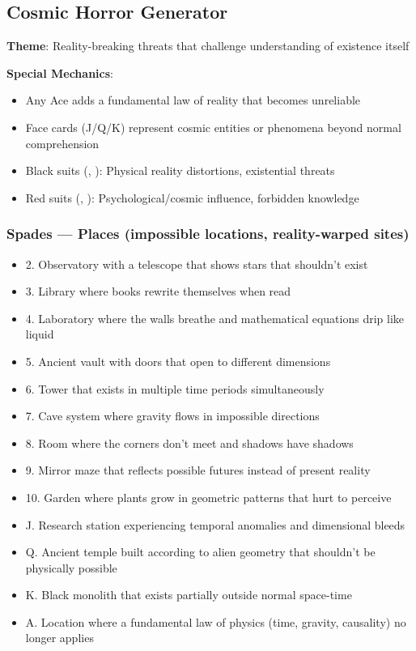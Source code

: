 \documentclass[11pt]{article}
\begin{document}
\subsection{Cosmic Horror Generator}

\begin{mdframed}[backgroundcolor=shadecolor]
\textbf{Theme}: Reality-breaking threats that challenge understanding of existence itself

\textbf{Special Mechanics}:
\begin{itemize}[leftmargin=*]
\item Any Ace adds a fundamental law of reality that becomes unreliable
\item Face cards (J/Q/K) represent cosmic entities or phenomena beyond normal comprehension
\item Black suits (\spadesuit, \clubsuit): Physical reality distortions, existential threats
\item Red suits (\heartsuit, \diamondsuit): Psychological/cosmic influence, forbidden knowledge
\end{itemize}
\end{mdframed}

\subsubsection{Spades --- Places (impossible locations, reality-warped sites)}
\begin{itemize}[leftmargin=*]
\item 2. Observatory with a telescope that shows stars that shouldn't exist
\item 3. Library where books rewrite themselves when read
\item 4. Laboratory where the walls breathe and mathematical equations drip like liquid
\item 5. Ancient vault with doors that open to different dimensions
\item 6. Tower that exists in multiple time periods simultaneously
\item 7. Cave system where gravity flows in impossible directions
\item 8. Room where the corners don't meet and shadows have shadows
\item 9. Mirror maze that reflects possible futures instead of present reality
\item 10. Garden where plants grow in geometric patterns that hurt to perceive
\item J. Research station experiencing temporal anomalies and dimensional bleeds
\item Q. Ancient temple built according to alien geometry that shouldn't be physically possible
\item K. Black monolith that exists partially outside normal space-time
\item A. Location where a fundamental law of physics (time, gravity, causality) no longer applies
\end{itemize}
\end{document}
